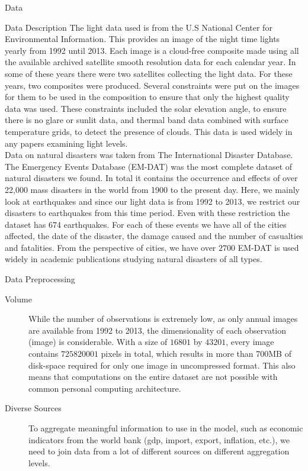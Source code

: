 \documentclass[12pt,fleqn,leqno,letterpaper]{article}
\begin{document}
\begin{section}{Data}
  \begin{subsection}{Data Description}
		The light data used is from the U.S National Center for Environmental Information. This provides an image of the night time lights yearly from 1992 until 2013. Each image is a cloud-free composite made using all the available archived satellite smooth resolution data for each calendar year. In some of these years there were two satellites collecting the light data. For these years, two composites were produced. Several constraints were put on the images for them to be used in the composition to ensure that only the highest quality data was used. These constraints included the solar elevation angle, to ensure there is no glare or sunlit data, and thermal band data combined with surface temperature grids, to detect the presence of clouds. This data is used widely in any papers examining light levels. \\
    Data on natural disasters was taken from The International Disaster Database. The Emergency Events Database (EM-DAT) was the most complete dataset of natural disasters we found. In total it contains the occurrence and effects of over 22,000 mass disasters in the world from 1900 to the present day. Here, we mainly look at earthquakes and since our light data is from 1992 to 2013, we restrict our disasters to earthquakes from this time period. Even with these restriction the dataset has 674 earthquakes. For each of these events we have all of the cities affected, the date of the disaster, the damage caused and the number of casualties and fatalities. From the perspective of cities, we have over $2700$ EM-DAT is used widely in academic publications studying natural disasters of all types.
  \end{subsection}
  \begin{subsection}{Data Preprocessing}
    \begin{description}
      \item[Volume]{While the number of observations is extremely low, as only annual images are available from 1992 to 2013, the dimensionality of each observation (image) is considerable. With a size of $16801$ by $43201$, every image contains $725820001$ pixels in total, which results in more than 700MB of disk-space required for only one image in uncompressed format. This also means that computations on the entire dataset are not possible with common personal computing architecture.}
      \item[Diverse Sources]{To aggregate meaningful information to use in the model, such as economic indicators from the world bank (gdp, import, export, inflation, etc.), we need to join data from a lot of different sources on different aggregation levels.}

\end{description}
\end{subsection}
\end{section}
\end{document}
